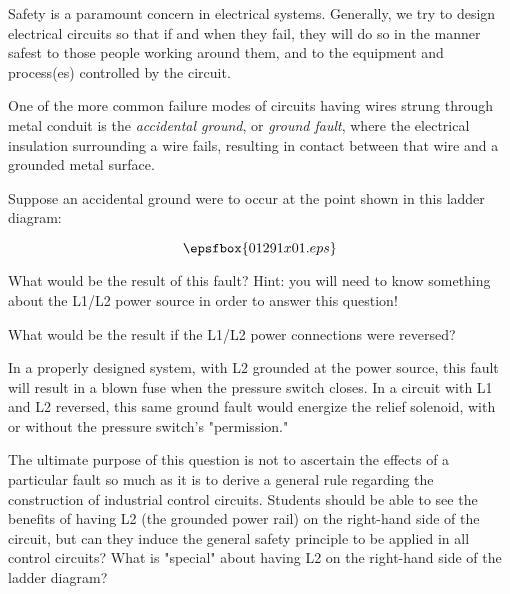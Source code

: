 

Safety is a paramount concern in electrical systems.  Generally, we try to design electrical circuits so that if and when they fail, they will do so in the manner safest to those people working around them, and to the equipment and process(es) controlled by the circuit.

One of the more common failure modes of circuits having wires strung through metal conduit is the {\it accidental ground}, or {\it ground fault}, where the electrical insulation surrounding a wire fails, resulting in contact between that wire and a grounded metal surface.

Suppose an accidental ground were to occur at the point shown in this ladder diagram:

$$\epsfbox{01291x01.eps}$$

What would be the result of this fault?  Hint: you will need to know something about the L1/L2 power source in order to answer this question!

What would be the result if the L1/L2 power connections were reversed?







In a properly designed system, with L2 grounded at the power source, this fault will result in a blown fuse when the pressure switch closes.  In a circuit with L1 and L2 reversed, this same ground fault would energize the relief solenoid, with or without the pressure switch's "permission."







The ultimate purpose of this question is not to ascertain the effects of a particular fault so much as it is to derive a general rule regarding the construction of industrial control circuits.  Students should be able to see the benefits of having L2 (the grounded power rail) on the right-hand side of the circuit, but can they induce the general safety principle to be applied in all control circuits?  What is "special" about having L2 on the right-hand side of the ladder diagram?




